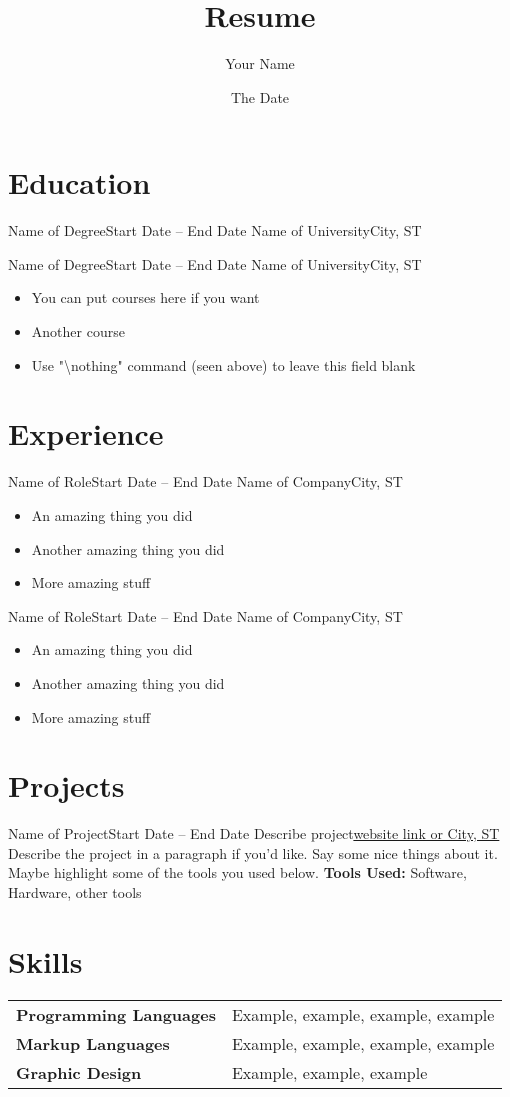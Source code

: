 \documentclass{article}
\title{Resume}
\author{Your Name}
\date{The Date}
\begin{document}
\sffamily %
\maketitle


\section{Education}

\entry
{Name of Degree}{Start Date -- End Date}
{Name of University}{City, ST}
{\nothing}

\entry
{Name of Degree}{Start Date -- End Date}
{Name of University}{City, ST}
{
\begin{itemize}
\item You can put courses here if you want
\item Another course
\item Use "\textbackslash nothing" command (seen above) to leave this field blank
\end{itemize}
}


\section{Experience}

\entry
{Name of Role}{Start Date -- End Date}
{Name of Company}{City, ST}
{
\begin{itemize}
\item An amazing thing you did
\item Another amazing thing you did
\item More amazing stuff
\end{itemize}
}

\entry
{Name of Role}{Start Date -- End Date}
{Name of Company}{City, ST}
{
\begin{itemize}
\item An amazing thing you did
\item Another amazing thing you did
\item More amazing stuff
\end{itemize}
}


\section{Projects}

\entry
{Name of Project}{Start Date -- End Date}
{Describe project}{\href{link_to_project.com}{website link or City, ST}}
{
Describe the project in a paragraph if you'd like.
Say some nice things about it.
Maybe highlight some of the tools you used below.
\textbf{Tools Used:} Software, Hardware, other tools
}


\section{Skills}

\begin{tabular}{ll}
\textbf{Programming Languages} & Example, example, example, example \\
\textbf{Markup Languages} & Example, example, example, example \\
\textbf{Graphic Design} & Example, example, example 
\end{tabular}
\end{document}
